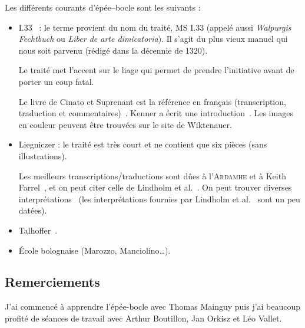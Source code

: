 \noindent
Les différents courants d'épée--bocle sont les suivants :
\begin{itemize}
	\item I.33~\cite{wiktenauer:I33} : le terme provient du nom du traité, MS I.33 (appelé aussi \emph{Walpurgis Fechtbuch} ou \emph{Liber de arte dimicatoria}).
		Il s'agit du plus vieux manuel qui nous soit parvenu (rédigé dans la décennie de 1320).
		
		Le traité met l'accent sur le liage qui permet de prendre l'initiative avant de porter un coup fatal.
		
		Le livre de Cinato et Suprenant est la référence en français (transcription, traduction et commentaires)~\cite{cinato:I33:2009}.
		Kenner a écrit une introduction~\cite{kenner:I33:2014}.
		Les images en couleur peuvent être trouvées sur le site de Wiktenauer.
		
	\item Liegniczer : le traité est très court et ne contient que six pièces (sans illustrations).
	
	Les meilleurs transcriptions/traductions sont dûes à l'\textsc{Ardamhe} et à Keith Farrel~\cite{ardamhe:liegniczer, farrell:liegnieczer}, et on peut citer celle de Lindholm et al.~\cite{lindholm:ringeck_others:2006}.
	On peut trouver diverses interprétations~\cite{farrell:pedagogy_liegnieczer:2014, youtube:sala_armi:liegniczer, youtube:memag:liegniczer, Myers:LiegniczerBuckler} (les interprétations fournies par Lindholm et al.~\cite{lindholm:ringeck_others:2006} sont un peu datées).
	
	\item Talhoffer~\cite{Talhoffer:2013:HansTalhofferFechtbuch}.
	
	\item École bolognaise (Marozzo, Manciolino…).
\end{itemize}


\subsection*{Remerciements}


J'ai commencé à apprendre l'épée-bocle avec Thomas Mainguy puis j'ai beaucoup profité de séances de travail avec Arthur Boutillon, Jan Orkisz et Léo Vallet.
